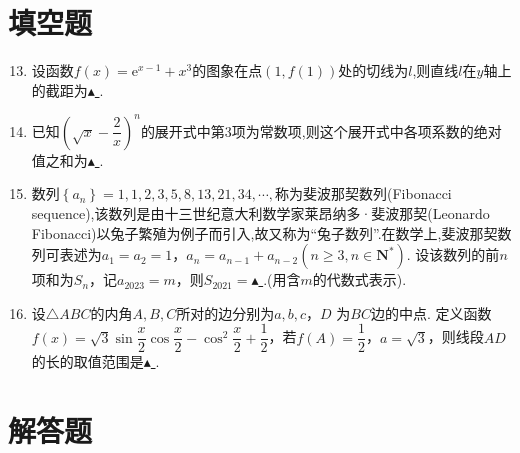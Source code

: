 \documentclass[11pt]{article}
\begin{document}
\section{\heiti 填空题}
\begin{enumerate}
	\setcounter{enumi}{12}
	\item 设函数$ f(x)=\mathrm{e}^{x-1}+x^3 $的图象在点$ (1,f(1)) $处的切线为$ l $,则直线$ l $在$ y $轴上的截距为\underline{\quad $ \blacktriangle $ \quad}.
	\item 已知$ \left ( \sqrt{x}-\dfrac{2}{x}   \right )^n $的展开式中第3项为常数项,则这个展开式中各项系数的绝对值之和为\underline{\quad $ \blacktriangle $ \quad}.
	\item 数列$ \left \{ a_n \right \} =1,1,2,3,5,8,13,21,34,\cdots , $称为斐波那契数列(Fibonacci sequence),该数列是由十三世纪意大利数学家莱昂纳多·斐波那契(Leonardo Fibonacci)以兔子繁殖为例子而引入,故又称为“兔子数列”.在数学上,斐波那契数列可表述为$ a_1=a_2=1 $，$ a_n=a_{n-1}+a_{n-2}(n \geqslant 3, n\in \mathbf{N}^{\text{*}}) $. 设该数列的前$n$项和为$S_n$，记$a_{2023}=m$，则$S_{2021}=$\underline{\quad $ \blacktriangle $ \quad}.(用含$m$的代数式表示).
	\item 设$ \triangle ABC $的内角$ A,B,C $所对的边分别为$ a,b,c $，$ D $ 为$ BC $边的中点. 定义函数$ f(x)=\sqrt{3}\sin \dfrac{x}{2} \cos \dfrac{x}{2}-\cos^2\dfrac{x}{2}+\dfrac{1}{2}$，若$ f(A)=\dfrac{1}{2} $，$ a=\sqrt{3} $，则线段$ AD $的长的取值范围是\underline{\quad $ \blacktriangle $ \quad}.
\end{enumerate}
\section{\heiti 解答题}
\end{document}
